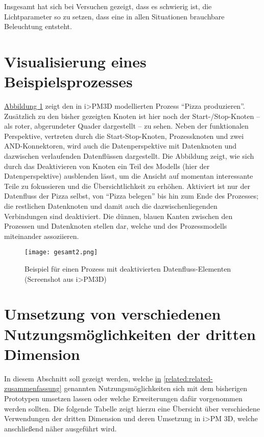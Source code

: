 \documentclass[a4paper,10pt]{sphinxmanual}
\begin{document}
Insgesamt hat sich bei Versuchen gezeigt, dass es schwierig ist, die Lichtparameter so zu setzen, dass eine in allen Situationen brauchbare Beleuchtung entsteht.


\section{Visualisierung eines Beispielsprozesses}
\label{visualisierung:vis-beispiel}\label{visualisierung:visualisierung-eines-beispielsprozesses}
\hyperref[visualisierung:beispielprozess-screenshot]{Abbildung  \ref*{visualisierung:beispielprozess-screenshot}} zeigt den in i\textgreater{}PM3D modellierten Prozess "`Pizza produzieren"'.
Zusätzlich zu den bisher gezeigten Knoten ist hier noch der Start-/Stop-Knoten – als roter, abgerundeter Quader dargestellt – zu sehen.
Neben der funktionalen Perspektive, vertreten durch die Start-Stop-Knoten, Prozessknoten und zwei AND-Konnektoren, wird auch die Datenperspektive mit Datenknoten und dazwischen verlaufenden Datenflüssen dargestellt.
Die Abbildung zeigt, wie sich durch das Deaktivieren von Knoten ein Teil des Modells (hier der Datenperspektive) ausblenden lässt, um die Ansicht auf momentan interessante Teile zu fokussieren und die Übersichtlichkeit zu erhöhen.
Aktiviert ist nur der Datenfluss der Pizza selbst, von "`Pizza belegen"' bis hin zum Ende des Prozesses; die restlichen Datenknoten und damit auch die dazwischenliegenden Verbindungen sind deaktiviert.
Die dünnen, blauen Kanten zwischen den Prozessen und Datenknoten stellen  dar, welche  und  des Prozessmodells miteinander assoziieren.
\begin{figure}[htbp]
\centering
\capstart

\texttt{[image: gesamt2.png]}
\caption{Beispiel für einen Prozess mit deaktivierten Datenfluss-Elementen (Screenshot aus i\textgreater{}PM3D)}\label{visualisierung:beispielprozess-screenshot}\end{figure}


\section{Umsetzung von verschiedenen Nutzungsmöglichkeiten der dritten Dimension}
\label{visualisierung:vis-umsetzung}\label{visualisierung:umsetzung-von-verschiedenen-nutzungsmoglichkeiten-der-dritten-dimension}
In diesem Abschnitt soll gezeigt werden, welche {\hyperref[related:related-zusammenfassung]{in}} \autoref*{related:related-zusammenfassung} genannten Nutzungsmöglichkeiten sich mit dem bisherigen Prototypen umsetzen lassen oder welche Erweiterungen dafür vorgenommen werden sollten.
Die folgende Tabelle zeigt hierzu eine Übersicht über verschiedene Verwendungen der dritten Dimension und deren Umsetzung in i\textgreater{}PM 3D, welche anschließend näher ausgeführt wird.
\end{document}
